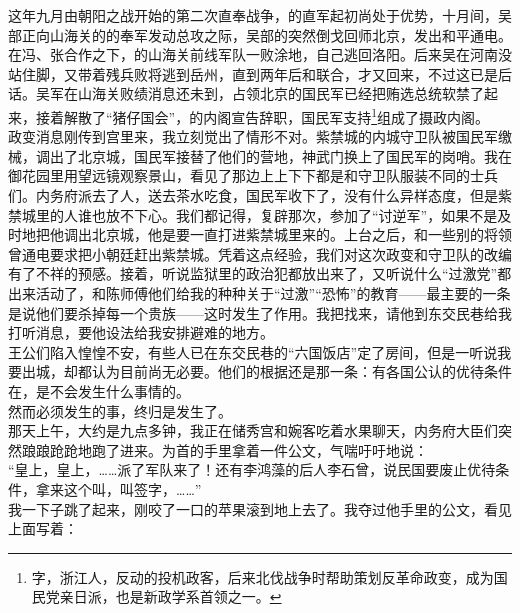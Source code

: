 这年九月由朝阳之战开始的第二次直奉战争，的直军起初尚处于优势，十月间，吴部正向山海关的的奉军发动总攻之际，吴部的突然倒戈回师北京，发出和平通电。在冯、张合作之下，的山海关前线军队一败涂地，自己逃回洛阳。后来吴在河南没站住脚，又带着残兵败将逃到岳州，直到两年后和联合，才又回来，不过这已是后话。吴军在山海关败绩消息还未到，占领北京的国民军已经把贿选总统软禁了起来，接着解散了“猪仔国会”，的内阁宣告辞职，国民军支持\footnote{字，浙江人，反动的投机政客，后来北伐战争时帮助策划反革命政变，成为国民党亲日派，也是新政学系首领之一。}组成了摄政内阁。\\

政变消息刚传到宫里来，我立刻觉出了情形不对。紫禁城的内城守卫队被国民军缴械，调出了北京城，国民军接替了他们的营地，神武门换上了国民军的岗哨。我在御花园里用望远镜观察景山，看见了那边上上下下都是和守卫队服装不同的士兵们。内务府派去了人，送去茶水吃食，国民军收下了，没有什么异样态度，但是紫禁城里的人谁也放不下心。我们都记得，复辟那次，参加了“讨逆军”，如果不是及时地把他调出北京城，他是要一直打进紫禁城里来的。上台之后，和一些别的将领曾通电要求把小朝廷赶出紫禁城。凭着这点经验，我们对这次政变和守卫队的改编有了不祥的预感。接着，听说监狱里的政治犯都放出来了，又听说什么“过激党”都出来活动了，和陈师傅他们给我的种种关于“过激”“恐怖”的教育——最主要的一条是说他们要杀掉每一个贵族——这时发生了作用。我把找来，请他到东交民巷给我打听消息，要他设法给我安排避难的地方。\\

王公们陷入惶惶不安，有些人已在东交民巷的“六国饭店”定了房间，但是一听说我要出城，却都认为目前尚无必要。他们的根据还是那一条：有各国公认的优待条件在，是不会发生什么事情的。\\

然而必须发生的事，终归是发生了。\\

那天上午，大约是九点多钟，我正在储秀宫和婉客吃着水果聊天，内务府大臣们突然踉踉跄跄地跑了进来。为首的手里拿着一件公文，气喘吁吁地说：\\

“皇上，皇上，……派了军队来了！还有李鸿藻的后人李石曾，说民国要废止优待条件，拿来这个叫，叫签字，……”\\

我一下子跳了起来，刚咬了一口的苹果滚到地上去了。我夺过他手里的公文，看见上面写着：\\

